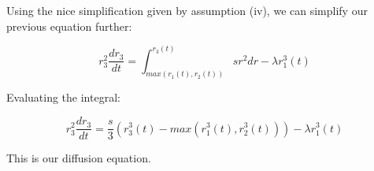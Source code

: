 \documentclass{article}
\begin{document}
Using the nice simplification given by assumption (iv), we can simplify our previous equation further:

\begin{equation}
    r_3^2\frac{dr_3}{dt} = \int_{max(r_1(t), r_2(t))}^{r_3(t)} s r^2 dr - \lambda r_1^3(t)
\end{equation}

Evaluating the integral:

\begin{equation}
    r_3^2\frac{dr_3}{dt} = \frac{s}{3} (r_3^3(t) - max(r_1^3(t), r_2^3(t))) - \lambda r_1^3(t)
\end{equation}

This is our diffusion equation.
\end{document}
